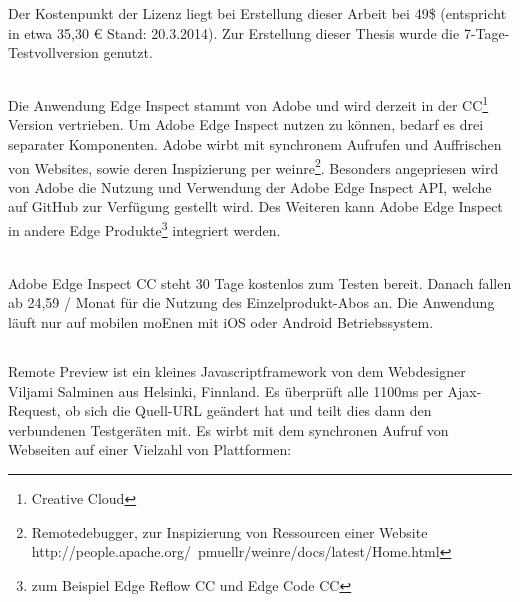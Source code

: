 	Der Kostenpunkt der Lizenz liegt bei Erstellung dieser Arbeit bei 49\$ (entspricht in etwa 35,30 € Stand: 20.3.2014). Zur Erstellung dieser Thesis wurde die 7-Tage-Testvollversion genutzt.
	
	\subsection{}
	Die Anwendung Edge Inspect stammt von Adobe und wird derzeit in der CC\footnote{Creative \Gls{Cloud}} Version vertrieben. Um Adobe Edge Inspect nutzen zu können, bedarf es drei separater Komponenten. Adobe wirbt mit synchronem Aufrufen und Auffrischen von Websites, sowie deren Inspizierung per weinre\footnote{Remotedebugger, zur Inspizierung von Ressourcen einer Website http://people.apache.org/~pmuellr/weinre/docs/latest/Home.html}. Besonders angepriesen wird von Adobe die Nutzung und Verwendung der Adobe Edge Inspect API, welche auf GitHub zur Verfügung gestellt wird. Des Weiteren kann Adobe Edge Inspect in andere Edge Produkte\footnote{zum Beispiel Edge Reflow CC und Edge Code CC} integriert werden. 
	
	\\Adobe Edge Inspect CC steht 30 Tage kostenlos zum Testen bereit. Danach fallen ab 24,59 / Monat für die Nutzung des Einzelprodukt-Abos an. Die Anwendung läuft nur auf mobilen \Gls{moEn}en mit iOS oder Android Betriebssystem.
	
	\subsection{}
	Remote Preview ist ein kleines \Gls{Javascript}framework von dem Webdesigner Viljami Salminen aus Helsinki, Finnland. Es überprüft alle 1100ms per \Gls{Ajax}-Request, ob sich die Quell-URL geändert hat und teilt dies dann den verbundenen Testgeräten mit. Es wirbt mit dem synchronen Aufruf von Webseiten auf einer Vielzahl von Plattformen: 
	
